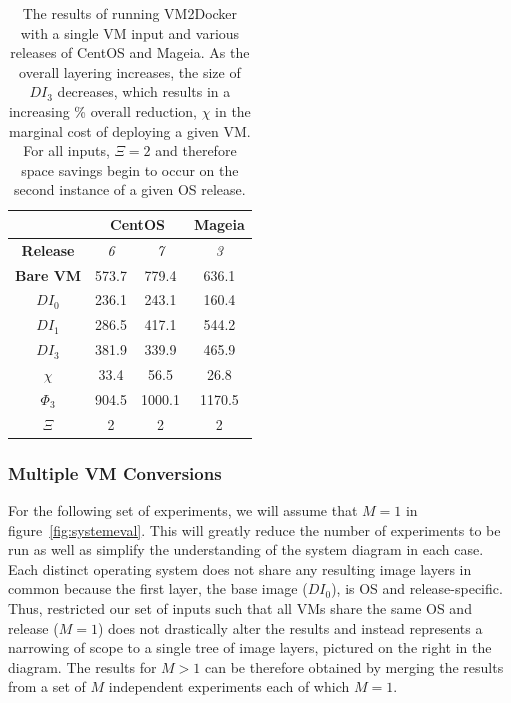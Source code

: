 \begin{table}[h]
\centering
    \begin{tabular}{| c | c | c | c |}
    \hline
& \multicolumn{2}{|c|}{\bfseries CentOS} & \multicolumn{1}{|c|}{\bfseries Mageia} \\ \hline
    \bfseries Release & \itshape 6 & \itshape 7 & \itshape 3 \\ \hline
    \bfseries Bare VM & 573.7 & 779.4 & 636.1\\ \hline
    \bfseries $DI_0$ & 236.1 & 243.1 & 160.4  \\ \hline
    \bfseries $DI_1$ & 286.5 & 417.1 & 544.2 \\ \hline
    \bfseries $DI_3$ & 381.9 & 339.9 & 465.9 \\ \hline
\bfseries $\chi$ & 33.4 & 56.5 & 26.8 \\ \hline
     \bfseries $\Phi_3$ & 904.5 & 1000.1 & 1170.5 \\ \hline
     \bfseries $\Xi$ & 2 & 2 & 2 \\ \hline
    \end{tabular}
\caption{The results of running VM2Docker with a single VM input and various releases of CentOS and Mageia. As the overall layering increases, the size of $DI_3$ decreases, which results in a increasing \% overall reduction, $\chi$ in the marginal cost of deploying a given VM. For all inputs, $\Xi = 2$ and therefore space savings begin to occur on the second instance of a given OS release.}
\label{table:diffpm2}
\end{table}




\subsubsection{Multiple VM Conversions}
\label{sec:multivm}
For the following set of experiments, we will assume that $M=1$ in figure~\ref{fig:systemeval}. This will greatly reduce the number of experiments to be run as well as simplify the understanding of the system diagram in each case. Each distinct operating system does not share any resulting image layers in common because the first layer, the base image ($DI_0$), is OS and release-specific. Thus, restricted our set of inputs such that all VMs share the same OS and release ($M=1$) does not drastically alter the results and instead represents a narrowing of scope to a single tree of image layers, pictured on the right in the diagram. The results for $M>1$ can be therefore obtained by merging the results from a set of $M$ independent experiments each of which $M=1$.

